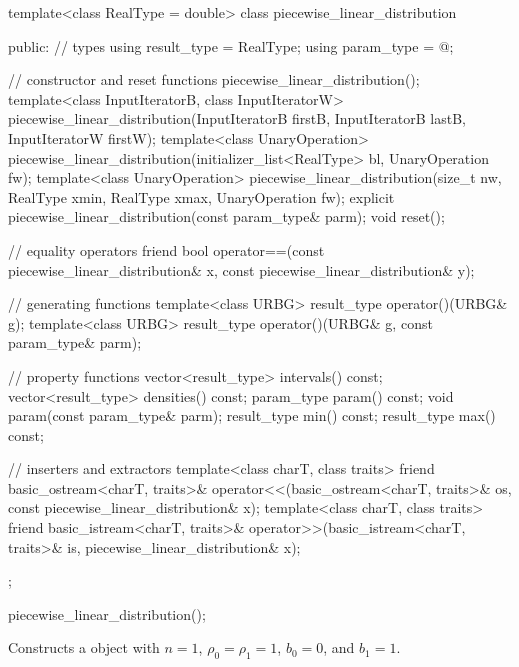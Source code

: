 %
%
\begin{codeblock}
template<class RealType = double>
  class piecewise_linear_distribution {
  public:
    // types
    using result_type = RealType;
    using param_type  = @\unspec@;

    // constructor and reset functions
    piecewise_linear_distribution();
    template<class InputIteratorB, class InputIteratorW>
      piecewise_linear_distribution(InputIteratorB firstB, InputIteratorB lastB,
                                    InputIteratorW firstW);
    template<class UnaryOperation>
      piecewise_linear_distribution(initializer_list<RealType> bl, UnaryOperation fw);
    template<class UnaryOperation>
      piecewise_linear_distribution(size_t nw, RealType xmin, RealType xmax, UnaryOperation fw);
    explicit piecewise_linear_distribution(const param_type& parm);
    void reset();

    // equality operators
    friend bool operator==(const piecewise_linear_distribution& x,
                           const piecewise_linear_distribution& y);

    // generating functions
    template<class URBG>
      result_type operator()(URBG& g);
    template<class URBG>
      result_type operator()(URBG& g, const param_type& parm);

    // property functions
    vector<result_type> intervals() const;
    vector<result_type> densities() const;
    param_type param() const;
    void param(const param_type& parm);
    result_type min() const;
    result_type max() const;

    // inserters and extractors
    template<class charT, class traits>
      friend basic_ostream<charT, traits>&
        operator<<(basic_ostream<charT, traits>& os, const piecewise_linear_distribution& x);
    template<class charT, class traits>
      friend basic_istream<charT, traits>&
        operator>>(basic_istream<charT, traits>& is, piecewise_linear_distribution& x);
  };
\end{codeblock}

\begin{itemdecl}
piecewise_linear_distribution();
\end{itemdecl}

\begin{itemdescr}
\pnum
\effects
Constructs a  object
 with $n = 1$,
 $\rho_0 = \rho_1 = 1$,
 $b_0 = 0$,
 and $b_1 = 1$.
\end{itemdescr}

